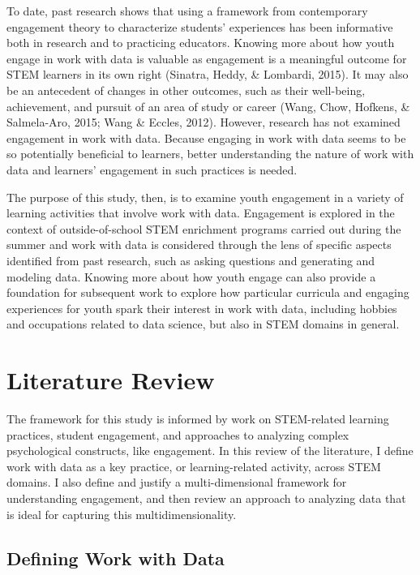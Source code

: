 \documentclass[]{msu-thesis}
\theoremstyle{definition}
\theoremstyle{definition}
\theoremstyle{definition}
\theoremstyle{remark}
\begin{document}
To date, past research shows that using a framework from contemporary
engagement theory to characterize students' experiences has been
informative both in research and to practicing educators. Knowing more
about how youth engage in work with data is valuable as engagement is a
meaningful outcome for STEM learners in its own right (Sinatra, Heddy,
\& Lombardi, 2015). It may also be an antecedent of changes in other
outcomes, such as their well-being, achievement, and pursuit of an area
of study or career (Wang, Chow, Hofkens, \& Salmela-Aro, 2015; Wang \&
Eccles, 2012). However, research has not examined engagement in work
with data. Because engaging in work with data seems to be so potentially
beneficial to learners, better understanding the nature of work with
data and learners' engagement in such practices is needed.

The purpose of this study, then, is to examine youth engagement in a
variety of learning activities that involve work with data. Engagement
is explored in the context of outside-of-school STEM enrichment programs
carried out during the summer and work with data is considered through
the lens of specific aspects identified from past research, such as
asking questions and generating and modeling data. Knowing more about
how youth engage can also provide a foundation for subsequent work to
explore how particular curricula and engaging experiences for youth
spark their interest in work with data, including hobbies and
occupations related to data science, but also in STEM domains in
general.

\chapter{Literature Review}\label{literature-review}

The framework for this study is informed by work on STEM-related
learning practices, student engagement, and approaches to analyzing
complex psychological constructs, like engagement. In this review of the
literature, I define work with data as a key practice, or
learning-related activity, across STEM domains. I also define and
justify a multi-dimensional framework for understanding engagement, and
then review an approach to analyzing data that is ideal for capturing
this multidimensionality.

\section{Defining Work with Data}\label{defining-work-with-data}
\end{document}
